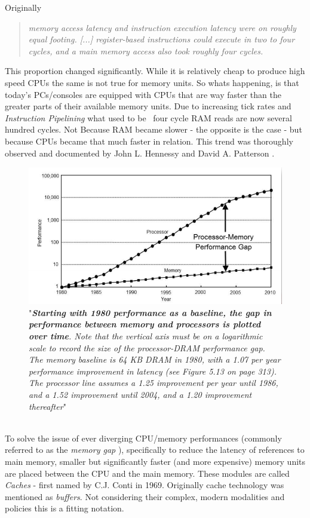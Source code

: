 Originally
\begin{quote}
	\textit{memory access latency and instruction execution latency were on roughly equal footing. [...] register-based instructions could execute in two to four cycles, and a main memory access also took roughly four cycles.} 
\end{quote}
This proportion changed significantly. While it is relatively cheap to produce high speed CPUs the same is not true for memory units. So whats happening, is that today's PCs/consoles are equipped with CPUs that are way faster than the greater parts of their available memory units. Due to increasing tick rates and \textit{Instruction Pipelining} what used to be ~four cycle RAM reads are now several hundred cycles. Not Because RAM became slower - the opposite is the case - but because CPUs became that much faster in relation.
This trend was thoroughly observed and documented by John L. Hennessy and David A. Patterson .\\
\begin{figure}[!htbp]
	\centering
	\includegraphics[width=0.7\linewidth]{PICs/cpu_memory_gap}
	\caption{"\textit{\textbf{Starting with 1980 performance as a baseline, the gap in performance
			between memory and processors is plotted over time}.
			Note that the vertical axis
			must be on a logarithmic scale to record the size of the processor-DRAM performance
			gap. The memory baseline is 64 KB DRAM in 1980, with a 1.07 per year performance
			improvement in latency (see Figure 5.13 on page 313). The processor line assumes a
			1.25 improvement per year until 1986, and a 1.52 improvement until 2004, and a 1.20
			improvement thereafter}" }\label{cpu_memory_gap}
\end{figure}\\
To solve the issue of ever diverging CPU/memory performances (commonly referred to as the \textit{memory gap }), specifically to reduce the latency of references to main memory, smaller but significantly faster (and more expensive) memory units are placed between the CPU and the main memory. These modules are called \textit{Caches} - first named by C.J. Conti  in 1969. Originally cache technology was mentioned as \textit{buffers}. Not considering their complex, modern modalities and policies this is a fitting notation.\\
